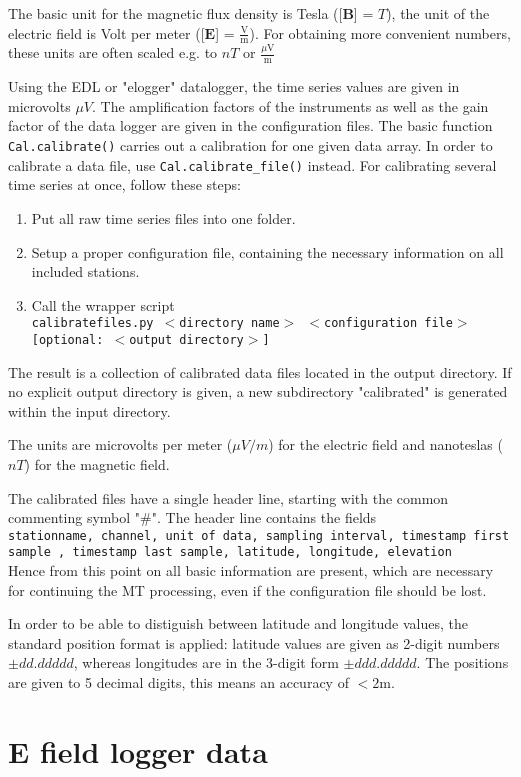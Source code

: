 The basic unit for the magnetic flux density is Tesla ([$\mathbf{B}$] = $T$), the unit of the electric field is Volt per meter ([$\mathbf{E}$] = $\frac{\mbox{V}}{\mbox{m}}$). For obtaining more convenient numbers, these units are often scaled e.g. to $nT$ or $\frac{\mu\mbox{V}}{\mbox{m}}$

Using the EDL or "elogger" datalogger, the time series values are given in microvolts $\mu V$. The amplification factors of the instruments as well as the gain factor of the data logger are given in the configuration files.
The basic function \texttt{Cal.calibrate()} carries out a calibration for one given data array. In order to calibrate a data file, use  \texttt{Cal.calibrate\_file()} instead.
For calibrating several time series at once, follow these steps:
\begin{enumerate}
\item Put all raw time series files into one folder.
\item Setup a proper configuration file, containing the necessary information on all included stations.  
\item Call the wrapper script\\
\texttt{calibratefiles.py $<$directory name$>$ $<$configuration file$>$ [optional: $<$output directory$>$] }  
\end{enumerate}
The result is a collection of calibrated data files located in the output directory. 
If no explicit output directory is given, a new subdirectory "calibrated" is generated within the input directory. 

The units are microvolts per meter ($\mu V/m$) for the electric field and nanoteslas ($nT$) for the magnetic field.

The calibrated files have a single header line, starting with the common commenting symbol "\#".
The header line contains the fields\\
\texttt{stationname, channel, unit of data, sampling interval, timestamp first sample , timestamp last sample, latitude, longitude, elevation}\\
Hence from this point on all basic information are present, which are necessary for continuing the MT processing, even if the configuration file should be lost. 

In order to be able to distiguish between latitude and longitude values, the standard position format is applied: latitude values are given as  2-digit numbers $\pm dd.ddddd$, whereas longitudes are in the 3-digit form $\pm ddd.ddddd$. The positions are given to 5 decimal digits, this means an accuracy of $< 2$m.



\section{E field logger data}
\label{sec:processing.elogger}

 